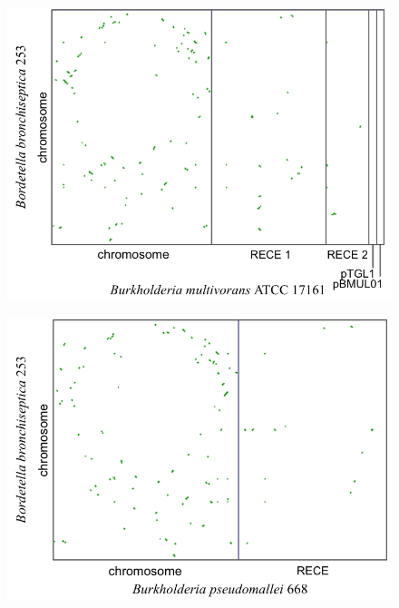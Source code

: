 \begin{figure}[H]
\begin{center}
\hspace{-3cm}
	\begin{minipage}{0.5\textwidth}
		\includegraphics[width=1.1\textwidth]{./img/synteny/new/fig8_10a.png}
		\label{figsyntburk1}
	\end{minipage}
	\begin{minipage}{0.5\textwidth}
		\hspace{1cm}
		\includegraphics[width=1.1\textwidth]{./img/synteny/new/fig8_10b.png}
		\label{figsyntburk2}

\end{minipage}
\end{center}
\end{figure}
